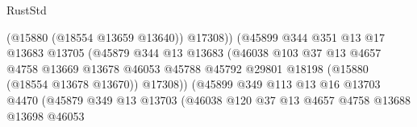 \begin{lexlean}{RustStd}
\begin{coremodule}
                                              (@15880 (@18554 @13659 @13640))
                                              @17308))
                                          (@45899
                                            @344
                                            @351
                                            @13
                                            @17
                                            @13683
                                            @13705
                                            (@45879
                                              @344
                                              @13
                                              @13683
                                              (@46038
                                                @103
                                                @37
                                                @13
                                                @4657
                                                @4758
                                                @13669
                                                @13678
                                                @46053
                                                @45788
                                                @45792
                                                @29801
                                                @18198
                                                (@15880 (@18554 @13678 @13670))
                                                @17308))
                                            (@45899
                                              @349
                                              @113
                                              @13
                                              @16
                                              @13703
                                              @4470
                                              (@45879
                                                @349
                                                @13
                                                @13703
                                                (@46038
                                                  @120
                                                  @37
                                                  @13
                                                  @4657
                                                  @4758
                                                  @13688
                                                  @13698
                                                  @46053

\end{coremodule}
\end{lexlean}
